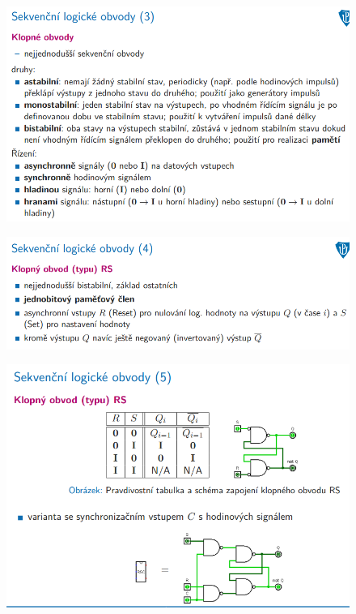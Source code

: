 \documentclass[10pt,a4paper]{article}
\begin{document}
\begin{figure} [h]
	\includegraphics[scale=0.65]{img/prvni_odstavec/otazka2/sekvencni_logicke_obvody3.png}	
\end{figure}

\begin{figure} [h]
	\includegraphics[scale=0.65]{img/prvni_odstavec/otazka2/sekvencni_logicke_obvody4.png}	
\end{figure}

\begin{figure} [h]
	\includegraphics[scale=0.65]{img/prvni_odstavec/otazka2/sekvencni_logicke_obvody5.png}	
\end{figure}
\end{document}
